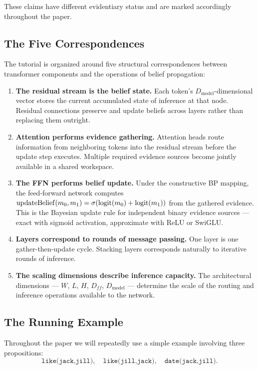 These claims have different evidentiary status and are marked
accordingly throughout the paper.

\subsection*{The Five Correspondences}

The tutorial is organized around five structural correspondences
between transformer components and the operations of belief
propagation:

\begin{enumerate}
\item \textbf{The residual stream is the belief state.} Each token's
$D_{\mathrm{model}}$-dimensional vector stores the current accumulated
state of inference at that node. Residual connections preserve and
update beliefs across layers rather than replacing them outright.

\item \textbf{Attention performs evidence gathering.} Attention heads
route information from neighboring tokens into the residual stream
before the update step executes. Multiple required evidence sources
become jointly available in a shared workspace.

\item \textbf{The FFN performs belief update.} Under the constructive
BP mapping, the feed-forward network computes
$\mathrm{updateBelief}(m_0, m_1) = \sigma(\operatorname{logit}(m_0) + \operatorname{logit}(m_1))$ from
the gathered evidence. This is the Bayesian update rule for
independent binary evidence sources --- exact with sigmoid activation,
approximate with ReLU or SwiGLU.

\item \textbf{Layers correspond to rounds of message passing.} One
layer is one gather-then-update cycle. Stacking layers corresponds
naturally to iterative rounds of inference.

\item \textbf{The scaling dimensions describe inference capacity.} The
architectural dimensions --- $W$, $L$, $H$, $D_{ff}$,
$D_{\mathrm{model}}$ --- determine the scale of the routing and
inference operations available to the network.
\end{enumerate}

\subsection*{The Running Example}

Throughout the paper we will repeatedly use a simple example involving
three propositions:
\[
\texttt{like(jack,jill)}, \quad \texttt{like(jill,jack)}, \quad
\texttt{date(jack,jill)}.
\]

